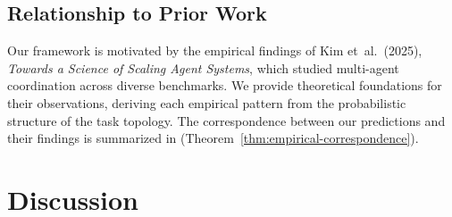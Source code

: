 \documentclass[12pt,a4paper]{article}
\theoremstyle{plain}
\theoremstyle{definition}
\theoremstyle{remark}
\begin{document}
\subsection{Relationship to Prior Work}

Our framework is motivated by the empirical findings of Kim et~al.\ (2025),
\emph{Towards a Science of Scaling Agent Systems}, which studied multi-agent
coordination across diverse benchmarks.  We provide theoretical foundations for
their observations, deriving each empirical pattern from the probabilistic
structure of the task topology.  The correspondence between our predictions and
their findings is summarized in  (Theorem~\ref{thm:empirical-correspondence}).

\newpage



\newpage



\newpage



\newpage



\newpage



\newpage



\newpage

\section{Discussion}
\label{sec:discussion}
\end{document}
